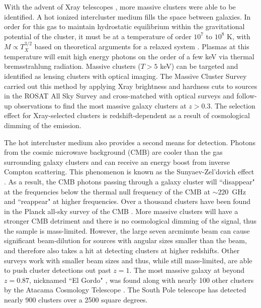 With the advent of Xray telescopes \citep{Giacconi:1968ly}, more massive clusters were able to be identified. A hot ionized intercluster medium fills the space between galaxies. In order for this gas to maintain hydrostatic equilibrium within the gravitational potential of the cluster, it must be at a temperature of order $10^7$ to $10^8$ K, with $M\propto T_X^{3/2}$ based on theoretical arguments for a relaxed system \citep{Horner:1999rz}. Plasmas at this temperature will emit high energy photons on the order of a few keV via thermal bremsstrahlung radiation. Massive clusters ($T>5$ keV) can be targeted and identified as lensing clusters with optical imaging. The Massive Cluster Survey \citep[MACS; ][]{Ebeling:2001rt} carried out this method by applying Xray brightness and hardness cuts to sources in the ROSAT All Sky Survey and cross-matched with optical surveys and follow-up observations to find the most massive galaxy clusters at $z>0.3$. The selection effect for Xray-selected clusters is redshift-dependent as a result of cosmological dimming of the emission.

The hot intercluster medium also provides a second means for detection. Photons from the cosmic microwave background (CMB) are cooler than the gas surrounding galaxy clusters and can receive an energy boost from inverse Compton scattering. This phenomenon is known as the Sunyaev-Zel'dovich effect \citep{Sunyaev:1972lr}. As a result, the CMB photons passing through a galaxy cluster will ``disappear" at the frequencies below the thermal null frequency of the CMB at $\sim220$~GHz and ``reappear" at higher frequencies. Over a thousand clusters have been found in the Planck all-sky survey of the CMB \citep{Planck-Collaboration:2014gf}. More massive clusters will have a stronger CMB detriment and there is no cosmological dimming of the signal, thus the sample is mass-limited. However, the large seven arcminute beam can cause significant beam-dilution for sources with angular sizes smaller than the beam, and therefore also takes a hit at detecting clusters at higher redshifts. Other surveys work with smaller beam sizes and thus, while still mass-limited, are able to push cluster detections out past $z=1$. The most massive galaxy at beyond $z=0.87$, nicknamed ``El Gordo" \citep{Menanteau:2012ul, Menanteau:2010fu}, was found along with nearly 100 other clusters by the Atacama Cosmology Telescope \citep[ACT; ][]{Hasselfield:2013pd,Marriage:2011qf}. The South Pole telescope \citep[SPT; ][]{Bleem:2015gf} has detected nearly 900 clusters over a 2500 square degrees. 

